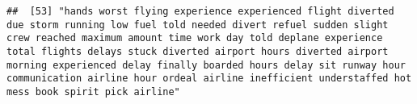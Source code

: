 \documentclass[
]{article}
\begin{document}
\begin{verbatim}
##  [53] "hands worst flying experience experienced flight diverted due storm running low fuel told needed divert refuel sudden slight crew reached maximum amount time work day told deplane experience total flights delays stuck diverted airport hours diverted airport morning experienced delay finally boarded hours delay sit runway hour communication airline hour ordeal airline inefficient understaffed hot mess book spirit pick airline"                                                                                                                                                                                                                                                                                                                                                                                                                                                                                                                                                                                                                                                                                                                                                                                                                                                                                                                                                                                                                                                                                                                                                                                                                                                                                                                                                  

\end{verbatim}
\end{document}
